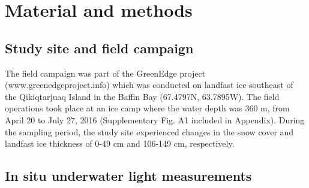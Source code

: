 \section{Material and methods}

\subsection{Study site and field campaign}

The field campaign was part of the GreenEdge project (www.greenedgeproject.info) which was conducted on landfast ice southeast of the Qikiqtarjuaq Island in the Baffin Bay (67.4797N, 63.7895W). The field operations took place at an ice camp where the water depth was 360 m, from April 20 to July 27, 2016 (Supplementary Fig. A1 included in Appendix). During the sampling period, the study site experienced changes in the snow cover and landfast ice thickness of 0-49 cm and 106-149 cm, respectively.

\subsection{In situ underwater light measurements}

